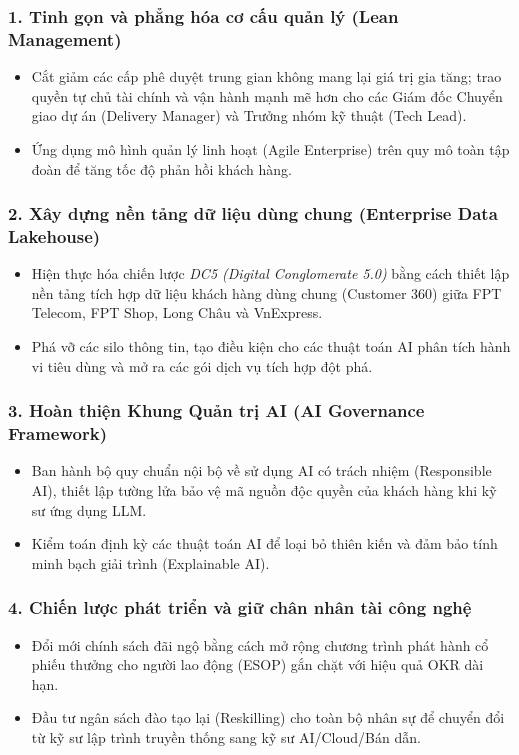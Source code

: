 \subsubsection{1. Tinh gọn và phẳng hóa cơ cấu quản lý (Lean Management)}
\begin{itemize}
    \item Cắt giảm các cấp phê duyệt trung gian không mang lại giá trị gia tăng; trao quyền tự chủ tài chính và vận hành mạnh mẽ hơn cho các Giám đốc Chuyển giao dự án (Delivery Manager) và Trưởng nhóm kỹ thuật (Tech Lead).
    \item Ứng dụng mô hình quản lý linh hoạt (Agile Enterprise) trên quy mô toàn tập đoàn để tăng tốc độ phản hồi khách hàng.
\end{itemize}

\subsubsection{2. Xây dựng nền tảng dữ liệu dùng chung (Enterprise Data Lakehouse)}
\begin{itemize}
    \item Hiện thực hóa chiến lược \textit{DC5 (Digital Conglomerate 5.0)} bằng cách thiết lập nền tảng tích hợp dữ liệu khách hàng dùng chung (Customer 360) giữa FPT Telecom, FPT Shop, Long Châu và VnExpress.
    \item Phá vỡ các silo thông tin, tạo điều kiện cho các thuật toán AI phân tích hành vi tiêu dùng và mở ra các gói dịch vụ tích hợp đột phá.
\end{itemize}

\subsubsection{3. Hoàn thiện Khung Quản trị AI (AI Governance Framework)}
\begin{itemize}
    \item Ban hành bộ quy chuẩn nội bộ về sử dụng AI có trách nhiệm (Responsible AI), thiết lập tường lửa bảo vệ mã nguồn độc quyền của khách hàng khi kỹ sư ứng dụng LLM.
    \item Kiểm toán định kỳ các thuật toán AI để loại bỏ thiên kiến và đảm bảo tính minh bạch giải trình (Explainable AI).
\end{itemize}

\subsubsection{4. Chiến lược phát triển và giữ chân nhân tài công nghệ}
\begin{itemize}
    \item Đổi mới chính sách đãi ngộ bằng cách mở rộng chương trình phát hành cổ phiếu thưởng cho người lao động (ESOP) gắn chặt với hiệu quả OKR dài hạn.
    \item Đầu tư ngân sách đào tạo lại (Reskilling) cho toàn bộ nhân sự để chuyển đổi từ kỹ sư lập trình truyền thống sang kỹ sư AI/Cloud/Bán dẫn.
\end{itemize}

